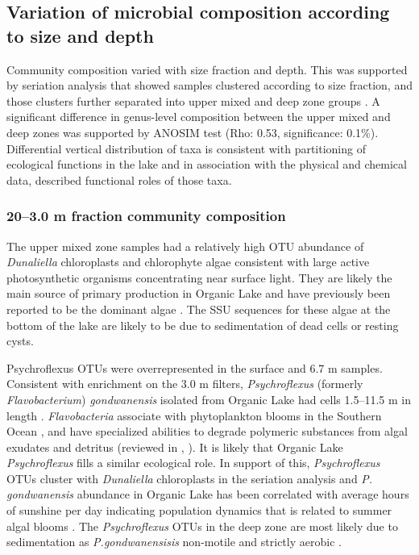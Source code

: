 \subsection{Variation of microbial composition according to size and depth}
Community composition varied with size fraction and depth. 
This was supported by seriation analysis that showed samples clustered according to size fraction, and those clusters further separated into upper mixed and deep zone groups . 
A significant difference in genus-level composition between the upper mixed and deep zones was supported by \ac{ANOSIM} test (Rho: 0.53, significance: 0.1\%). 
Differential vertical distribution of taxa is consistent with partitioning of ecological functions in the lake and in association with the physical and chemical data, described functional roles of those taxa.


\subsubsection{20--3.0 \textmu{}m fraction community composition}
The upper mixed zone samples had a relatively high \ac{OTU} abundance of \emph{Dunaliella} chloroplasts and chlorophyte algae consistent with large active photosynthetic organisms concentrating near surface light. 
They are likely the main source of primary production in Organic Lake and have previously been reported to be the dominant algae \cite{Franzmann1987b}. 
The \ac{SSU} sequences for these algae at the bottom of the lake are likely to be due to sedimentation of dead cells or resting cysts.

Psychroflexus \acp{OTU} were overrepresented in the surface and 6.7 m samples. 
Consistent with enrichment on the 3.0 \textmu{}m filters, \emph{Psychroflexus} (formerly \emph{Flavobacterium}) \emph{gondwanensis} \cite{Bowman1998} isolated from Organic Lake \cite{Franzmann1987b} had cells 1.5--11.5 \textmu{}m in length \cite{Dobson1991}. 
\emph{Flavobacteria} associate with phytoplankton blooms in the Southern Ocean \cite{Abell2005a, Abell2005b, Williams2012b}, and have specialized abilities to degrade polymeric substances from algal exudates and detritus (reviewed in \citet{Kirchman2002}, \cite{Williams2012b}). 
It is likely that Organic Lake \emph{Psychroflexus} fills a similar ecological role. 
In support of this, \emph{Psychroflexus} \acp{OTU} cluster with \emph{Dunaliella} chloroplasts in the seriation analysis  and \emph{P. gondwanensis} abundance in Organic Lake has been correlated with average hours of sunshine per day indicating population dynamics that is related to summer algal blooms \cite{James1994}. 
The \emph{Psychroflexus} \acp{OTU} in the deep zone are most likely due to sedimentation as \emph{P.gondwanensisis} non-motile and strictly aerobic \cite{Dobson1991}.


